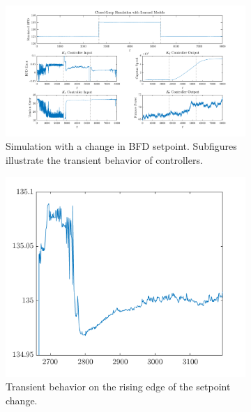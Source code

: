 \begin{figure}[ht!]
    \centering
    \begin{subfigure}[b]{\textwidth}
        \includegraphics[width=\textwidth]{figures/closed_loop_sim_setpoint.png}
        \caption{Simulation with a change in BFD setpoint. Subfigures illustrate the transient behavior of controllers. }
        \label{fig:sim_setpoint}
    \end{subfigure}
    \begin{subfigure}[b]{0.48\textwidth}
        \centering
        \includegraphics[width=\textwidth]{figures/setpoint_rising.png}
        \caption{Transient behavior on the rising edge of the setpoint change.}
    \end{subfigure}
    \hfill
    \begin{subfigure}[b]{0.48\textwidth}
        \centering

\end{subfigure}
\end{figure}
